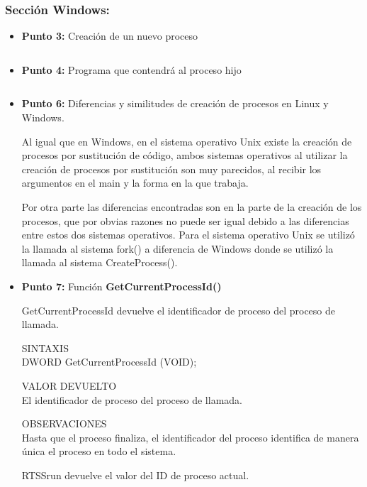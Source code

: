 \documentclass[12pt]{article}
\begin{document}
            \subsubsection{Sección Windows:}
                \begin{itemize}
                    \item[\Checkmark] \textbf{Punto 3:} Creación de un nuevo proceso
                    

                    \inputminted{c++}{Code/Windows/3.c} 
                    
                    \item[\Checkmark] \textbf{Punto 4:} Programa que contendrá al proceso hijo
                    
                    \inputminted{c++}{Code/Windows/4.c} 

            
                    \item[\Checkmark] \textbf{Punto 6:} Diferencias y similitudes de creación de procesos en Linux y Windows.

                    Al igual que en Windows, en el sistema operativo Unix existe la creación de procesos por sustitución de código, ambos sistemas operativos al utilizar la creación de procesos por sustitución son muy parecidos, al recibir los argumentos en el main y la forma en la que trabaja.
                    
                    Por otra parte las diferencias encontradas son en la parte de la creación de los procesos, que por obvias razones no puede ser igual debido a las diferencias entre estos dos sistemas operativos. Para el sistema operativo Unix se utilizó la llamada al sistema fork() a diferencia de Windows donde se utilizó la llamada al sistema CreateProcess().

                    \item[\Checkmark] \textbf{Punto 7:} Función \textbf{GetCurrentProcessId()}
                   
                   GetCurrentProcessId devuelve el identificador de proceso del proceso de llamada.

                    SINTAXIS\\
                    DWORD GetCurrentProcessId (VOID);
                    
                    
                    VALOR DEVUELTO\\
                    El identificador de proceso del proceso de llamada.
                    
                    OBSERVACIONES\\
                    Hasta que el proceso finaliza, el identificador del proceso identifica de manera única el proceso en todo el sistema.
                    
                    RTSSrun devuelve el valor del ID de proceso actual.
                \end{itemize}
        
\end{document}
